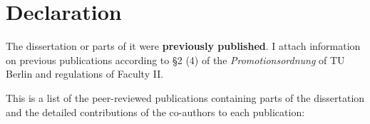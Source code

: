 \noindent
\pagestyle{empty}

\section*{Declaration}

The dissertation or parts of it were \textbf{previously published}. I attach information on previous publications according to \S 2 (4) of the \emph{Promotionsordnung} of TU Berlin and regulations of Faculty II.

\vspace{2ex}

This is a list of the peer-reviewed publications containing parts of the dissertation and the detailed contributions of the co-authors to each publication:

